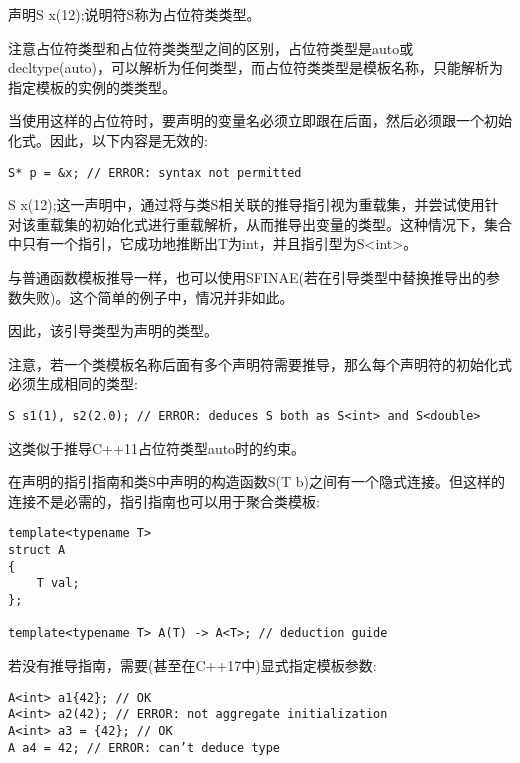 声明S x(12);说明符S称为占位符类类型。

\begin{tcolorbox}[colback=webgreen!5!white,colframe=webgreen!75!black]
\hspace*{0.75cm}注意占位符类型和占位符类类型之间的区别，占位符类型是auto或decltype(auto)，可以解析为任何类型，而占位符类类型是模板名称，只能解析为指定模板的实例的类类型。
\end{tcolorbox}

当使用这样的占位符时，要声明的变量名必须立即跟在后面，然后必须跟一个初始化式。因此，以下内容是无效的:
	
\begin{lstlisting}[style=styleCXX]
S* p = &x; // ERROR: syntax not permitted
\end{lstlisting}

S x(12);这一声明中，通过将与类S相关联的推导指引视为重载集，并尝试使用针对该重载集的初始化式进行重载解析，从而推导出变量的类型。这种情况下，集合中只有一个指引，它成功地推断出T为int，并且指引型为S<int>。

\begin{tcolorbox}[colback=webgreen!5!white,colframe=webgreen!75!black]
\hspace*{0.75cm}与普通函数模板推导一样，也可以使用SFINAE(若在引导类型中替换推导出的参数失败)。这个简单的例子中，情况并非如此。
\end{tcolorbox}

因此，该引导类型为声明的类型。

注意，若一个类模板名称后面有多个声明符需要推导，那么每个声明符的初始化式必须生成相同的类型:

\begin{lstlisting}[style=styleCXX]
S s1(1), s2(2.0); // ERROR: deduces S both as S<int> and S<double>
\end{lstlisting}

这类似于推导C++11占位符类型auto时的约束。

在声明的指引指南和类S中声明的构造函数S(T b)之间有一个隐式连接。但这样的连接不是必需的，指引指南也可以用于聚合类模板:

\begin{lstlisting}[style=styleCXX]
template<typename T>
struct A
{
	T val;
};

template<typename T> A(T) -> A<T>; // deduction guide
\end{lstlisting}

若没有推导指南，需要(甚至在C++17中)显式指定模板参数:

\begin{lstlisting}[style=styleCXX]
A<int> a1{42}; // OK
A<int> a2(42); // ERROR: not aggregate initialization
A<int> a3 = {42}; // OK
A a4 = 42; // ERROR: can’t deduce type
\end{lstlisting}

